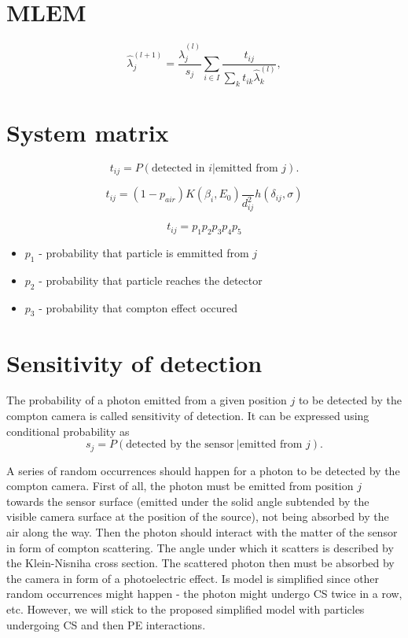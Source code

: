 \section{MLEM}
\begin{equation}
\hat{\lambda}_{j}^{(l+1)} = \frac{\hat{\lambda}_{j}^{(l)}}{s_{j}} \sum_{i \in I} \frac{t_{ij}}{\sum_{k} t_{ik} \hat{\lambda}_{k}^{(l)}},
  \label{eq:MLEM}
\end{equation}

\section{System matrix}
\begin{equation}
t_{ij} =  P(\textrm{detected in } i | \textrm{emitted from } j).
\end{equation}

\begin{equation}
  t_{ij} =  (1-p_{air})  K(\beta_{i},E_{0}) \frac{}{d^{2}_{ij}} h(\delta_{ij}, \sigma)
\end{equation}


\begin{equation}
  t_{ij} =  p_{1}p_{2}p_{3}p_{4}p_{5}
\end{equation}

\begin{itemize}
  \item $p_{1}$ - probability that particle is emmitted from $j$
  \item $p_{2}$ - probability that particle reaches the detector
  \item $p_{3}$ - probability that compton effect occured
\end{itemize}


\section{Sensitivity of detection}
The probability of a photon emitted from a given position $j$ to be detected by the compton camera is called sensitivity of detection.
It can be expressed using conditional probability as 
\begin{equation}
  s_{j} =  P(\textrm{detected by the sensor}\ | \textrm{emitted from } j).
\end{equation}

A series of random occurrences should happen for a photon to be detected by the compton camera.
First of all, the photon must be emitted from position $j$ towards the sensor surface (emitted under the solid angle subtended by the visible camera surface at the position of the source), not being absorbed by the air along the way.
Then the photon should interact with the matter of the sensor in form of compton scattering.
The angle under which it scatters is described by the Klein-Nisniha cross section.
The scattered photon then must be absorbed by the camera in form of a photoelectric effect.
Is model is simplified since other random occurrences might happen - the photon might undergo \ac{CS} twice in a row, etc.
However, we will stick to the proposed simplified model with particles undergoing \ac{CS} and then \ac{PE} interactions.

